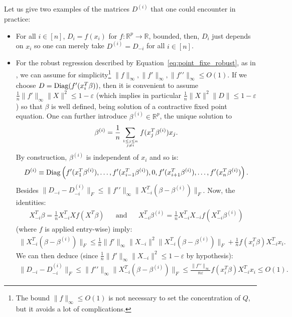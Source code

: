 \documentclass[a4papaer, titlepage]{book}
\begin{document}
 \begin{remark}\label{rem:D_m_D_(i)}
   Let us give two examples of the matrices $D^{(i)}$ that one could encounter in practice:
   \begin{itemize}
      \item For all $ i \in[n]$, $D_i =f(x_{i})$ for $f: \mathbb R^{p} \to \mathbb R$, bounded, then, $D_i$ just depends on $x_i$ so one can merely take $D^{(i)} = D_{-i}$ for all $i \in[n]$.
      \item For the robust regression described by Equation~\ref{eq:point_fixe_robust}, as in \cite{SED21}, we can assume for simplicity\footnote{The bound $\|f\|_\infty \leq O(1)$ is not necessary to set the concentration of $Q$, but it avoids a lot of complications.} $\|f\|_\infty,\|f'\|_\infty,\|f'{}'\|_\infty \leq O(1)$. If we choose $D = \operatorname{Diag}(f'(x_i^T\beta))$, then it is convenient to assume $\frac{1}{n}\|f'\|_\infty \|X\|^2 \leq 1-\varepsilon $ (which implies in particular $\frac{1}{n}\|X\|^2\|D\| \leq 1-\varepsilon$) so that $\beta$ is well defined, being solution of a contractive fixed point equation. One can further introduce $\beta^{(i)} \in \mathbb R^p$, the unique solution to
      \begin{align*}
        \beta^{(i)} = \frac{1}{n}\sum_{\genfrac{}{}{0pt}{2}{1\leq j \leq n}{j \neq i}}f(x_j^T \beta^{(i)}) x_j.
      \end{align*}
      By construction, $\beta^{(i)}$ is independent of $x_i$ and so is:
      \begin{align*}
        D^{(i)}\equiv \operatorname{Diag} \left(f'(x_1^T\beta^{(i)}), \ldots, f'(x_{i-1}^T\beta^{(i)}), 0, f'(x_{i+1}^T\beta^{(i)}), \ldots, f'(x_n^T\beta^{(i)}) \right).
      \end{align*}
      Besides $\|D_{-i}-D^{(i)}_{-i} \|_F \leq \|f'{}'\|_\infty \|X_{-i}^T(\beta - \beta^{(i)}) \|_F$. Now, the identities:
      \begin{align*}
        X_{-i}^T\beta = \frac{1}{n}X_{-i}^TXf(X^T\beta)&
        &\text{and}&
        &X_{-i}^T\beta^{(i)} = \frac{1}{n}X_{-i}^TX_{-i}f(X_{-i}^T\beta^{(i)})
      \end{align*}
      (where $f$ is applied entry-wise) imply:
      \begin{align*}
        \|X_{-i}^T(\beta - \beta^{(i)}) \|_F \leq \frac{1}{n} \|f'\|_\infty \|X_{-i}\|^2 \|X_{-i}^T(\beta - \beta^{(i)}) \|_F + \frac{1}{n}f(x_i^T\beta)X_{-i}^Tx_i.
      \end{align*}
      We can then deduce (since $\frac{1}{n} \|f'\|_\infty \|X_{-i}\|^2 \leq 1-\varepsilon$ by hypothesis):
      \begin{align*}
         \|D_{-i}-D^{(i)}_{-i} \|_F \leq \|f'{}'\|_\infty\|X_{-i}^T(\beta - \beta^{(i)}) \|_F \leq \frac{ \|f'{}'\|_\infty}{n\varepsilon}f(x_i^T\beta)X_{-i}^Tx_i \leq O(1).
      \end{align*}

    \end{itemize} 
 \end{remark}
\end{document}
